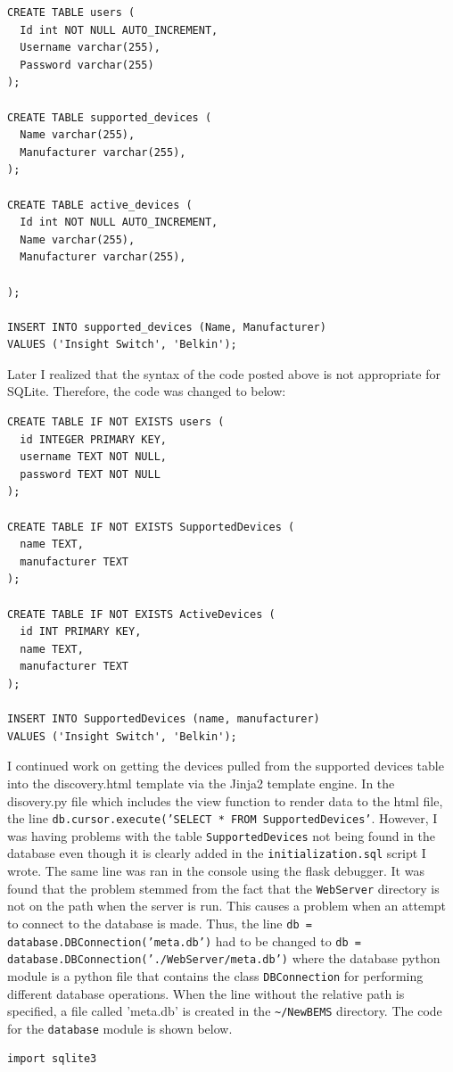 \documentclass[fontsize=11pt, %
                             paper=letter, %
                             twoside, %
                             captions=tableheading,
                             index=totoc,
                             hyperref]{labbook}
\begin{document}
\begin{addmargin}[0cm]{0cm}
\begin{Verbatim}
CREATE TABLE users (
  Id int NOT NULL AUTO_INCREMENT,
  Username varchar(255),
  Password varchar(255)
);

CREATE TABLE supported_devices (
  Name varchar(255),
  Manufacturer varchar(255),
);

CREATE TABLE active_devices (
  Id int NOT NULL AUTO_INCREMENT,
  Name varchar(255),
  Manufacturer varchar(255),

);

INSERT INTO supported_devices (Name, Manufacturer)
VALUES ('Insight Switch', 'Belkin');

\end{Verbatim}
Later I realized that the syntax of the code posted above is not appropriate for SQLite. Therefore, the code was changed to below:
\begin{Verbatim}
CREATE TABLE IF NOT EXISTS users (
  id INTEGER PRIMARY KEY,
  username TEXT NOT NULL,
  password TEXT NOT NULL
);

CREATE TABLE IF NOT EXISTS SupportedDevices (
  name TEXT,
  manufacturer TEXT
);

CREATE TABLE IF NOT EXISTS ActiveDevices (
  id INT PRIMARY KEY,
  name TEXT,
  manufacturer TEXT
);

INSERT INTO SupportedDevices (name, manufacturer)
VALUES ('Insight Switch', 'Belkin');

\end{Verbatim}

I continued work on getting the devices pulled from the supported devices table into the discovery.html template via the Jinja2 template engine. In the disovery.py file which includes the view function to render data to the html file, the line \texttt{db.cursor.execute('SELECT * FROM SupportedDevices'}. However, I was having problems with the table \texttt{SupportedDevices} not being found in the database even though it is clearly added in the \texttt{initialization.sql} script I wrote. The same line was ran in the console using the flask debugger. It was found that the problem stemmed from the fact that the \texttt{WebServer} directory is not on the path when the server is run. This causes a problem when an attempt to connect to the database is made. Thus, the line \texttt{db = database.DBConnection('meta.db')} had to be changed to \texttt{db = database.DBConnection('./WebServer/meta.db')} where the database python module is a python file that contains the class \texttt{DBConnection} for performing different database operations. When the line without the relative path is specified, a file called 'meta.db' is created in the \texttt{\textasciitilde /NewBEMS} directory. The code for the \texttt{database} module is shown below.
\begin{Verbatim}
import sqlite3


\end{Verbatim}
\end{addmargin}
\end{document}
